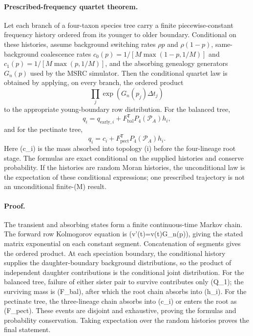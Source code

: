 \paragraph{Prescribed-frequency quartet theorem.}
Let each branch of a four-taxon species tree carry a finite piecewise-constant
frequency history ordered from its younger to older boundary. Conditional on
these histories, assume background switching rates
\(\rho p\) and \(\rho(1-p)\), same-background coalescence rates
\(c_0(p)=1/[M\max(1-p,1/M)]\) and
\(c_1(p)=1/[M\max(p,1/M)]\), and the absorbing genealogy generators
\(G_n(p)\) used by the MSRC simulator. Then the conditional quartet law is
obtained by applying, on every branch, the ordered product
\[
\prod_j\exp(G_n(p_j)\Delta t_j)
\]
to the appropriate young-boundary row distribution. For the balanced tree,
\[
q_i=q_{\mathrm{early},i}+F_{\mathrm{bal}}^{\mathsf T}
P_4(\mathcal P_A)h_i,
\]
and for the pectinate tree,
\[
q_i=c_i+F_{\mathrm{pect}}^{\mathsf T}P_4(\mathcal P_A)h_i.
\]
Here (c_i) is the mass absorbed into topology (i) before the four-lineage
root stage. The formulas are exact conditional on the supplied histories and
conserve probability. If the histories are random Moran histories, the
unconditional law is the expectation of these conditional expressions; one
prescribed trajectory is not an unconditional finite-(M) result.

\paragraph{Proof.}
The transient and absorbing states form a finite continuous-time Markov chain.
The forward row Kolmogorov equation is (v'(t)=v(t)G_n(p)), giving the stated
matrix exponential on each constant segment. Concatenation of segments gives
the ordered product. At each speciation boundary, the conditional history
supplies the daughter-boundary background distributions, so the product of
independent daughter contributions is the conditional joint distribution.
For the balanced tree, failure of either sister pair to survive contributes
only (Q_1); the surviving mass is (F_{\rm bal}), after which the root
chain absorbs into (h_i). For the pectinate tree, the three-lineage chain
absorbs into (c_i) or enters the root as (F_{\rm pect}). These events are
disjoint and exhaustive, proving the formulas and probability conservation.
Taking expectation over the random histories proves the final statement.
